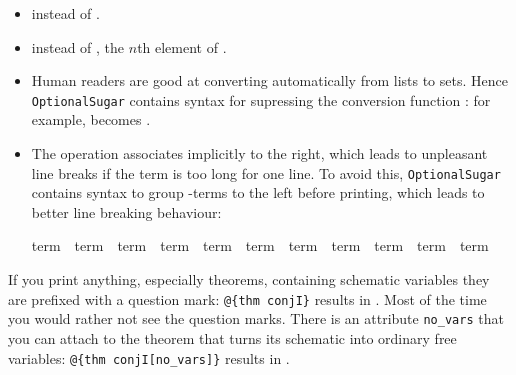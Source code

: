 \begin{isabellebody}
\begin{isamarkuptext}
\begin{itemize}
\item {} instead of .
\item {} instead of ,
      the $n$th element of .

\item Human readers are good at converting automatically from lists to
sets. Hence \texttt{OptionalSugar} contains syntax for supressing the
conversion function : for example, 
becomes .

\item The \isa{{\isacharat}} operation associates implicitly to the right,
which leads to unpleasant line breaks if the term is too long for one
line. To avoid this, \texttt{OptionalSugar} contains syntax to group
\isa{{\isacharat}}-terms to the left before printing, which leads to better
line breaking behaviour:
\begin{isabelle}%
term\ \isacharat\ term\ \isacharat\ term\ \isacharat\ term\ \isacharat\ term\ \isacharat\ term\ \isacharat\ term\ \isacharat\ term\ \isacharat\ term\ \isacharat\ term\ \isacharat\ term%
\end{isabelle}

\end{itemize}%
\end{isamarkuptext}%
\isamarkuptrue%
%
\isamarkuptrue%
%
\isamarkuptrue%
%
\begin{isamarkuptext}%
If you print anything, especially theorems, containing
schematic variables they are prefixed with a question mark:
\verb!@!\verb!{thm conjI}! results in . Most of the time
you would rather not see the question marks. There is an attribute
\verb!no_vars! that you can attach to the theorem that turns its
schematic into ordinary free variables: \verb!@!\verb!{thm conjI[no_vars]}!
results in .


\end{isamarkuptext}
\end{isabellebody}

